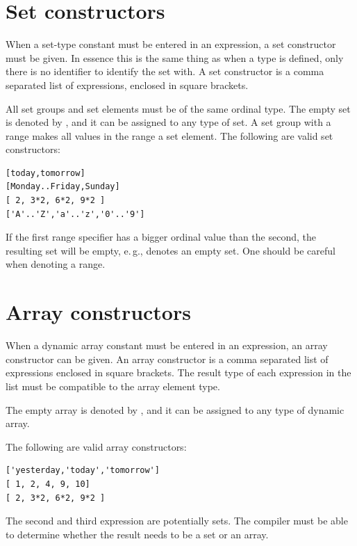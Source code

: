 \section{Set constructors}
When a set-type constant must be entered in an expression, a
set constructor must be given. In essence this is the same thing as when a
type is defined, only there is no identifier to identify the set with.
A set constructor is a comma separated list of expressions, enclosed in
square brackets.

All set groups and set elements must be of the same ordinal type.
The empty set is denoted by \var{[]}, and it can be assigned to any type of
set. A set group with a range  \var{[A..Z]} makes all values in the range a
set element.
The following are valid set constructors:
\begin{verbatim}
[today,tomorrow]
[Monday..Friday,Sunday]
[ 2, 3*2, 6*2, 9*2 ]
['A'..'Z','a'..'z','0'..'9']
\end{verbatim}
\begin{remark}
If the first range specifier has a bigger ordinal value than
the second, the resulting set will be empty, e.\,g., \var{['Z'..'A']}
denotes an empty set. One should be careful when denoting a range.
\end{remark}

\section{Array constructors}
When a dynamic array constant must be entered in an expression, an array constructor can be given.
An array constructor is a comma separated list of expressions enclosed in square brackets.
The result type of each expression in the list must be compatible to the array element type. 


The empty array is denoted by \var{[]}, and it can be assigned to any type of
dynamic array.

The following are valid array constructors:
\begin{verbatim}
['yesterday,'today','tomorrow']
[ 1, 2, 4, 9, 10]
[ 2, 3*2, 6*2, 9*2 ]
\end{verbatim}
The second and third expression are potentially sets. 
The compiler must be able to determine whether the result needs to be a set or an array.

